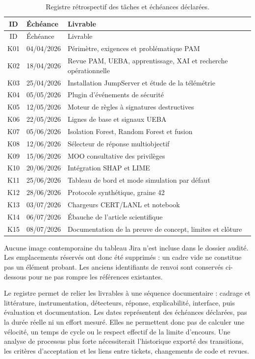 \documentclass[11pt,a4paper,oneside]{report}
\theoremstyle{definition}
\theoremstyle{plain}
\begin{document}
\begin{longtable}{@{}clp{}@{}}
\caption{Registre rétrospectif des tâches et échéances déclarées.}
\label{tab:app-jira}\\
\toprule
ID & Échéance & Livrable \\
\midrule
\endfirsthead
\toprule
ID & Échéance & Livrable \\
\midrule
\endhead
K01  & 04/04/2026 & Périmètre, exigences et problématique PAM \\
K02  & 18/04/2026 & Revue PAM, UEBA, apprentissage, XAI et recherche opérationnelle \\
K03  & 25/04/2026 & Installation JumpServer et étude de la télémétrie \\
K04  & 05/05/2026 & Plugin d'événements de sécurité \\
K05  & 12/05/2026 & Moteur de règles à signatures destructives \\
K06  & 22/05/2026 & Lignes de base et signaux UEBA \\
K07  & 05/06/2026 & Isolation Forest, Random Forest et fusion \\
K08  & 12/06/2026 & Sélecteur de réponse multiobjectif \\
K09  & 15/06/2026 & MOO consultative des privilèges \\
K10 & 20/06/2026 & Intégration SHAP et LIME \\
K11 & 25/06/2026 & Tableau de bord et mode simulation par défaut \\
K12 & 28/06/2026 & Protocole synthétique, graine 42 \\
K13 & 03/07/2026 & Chargeurs CERT/LANL et notebook \\
K14 & 06/07/2026 & Ébauche de l'article scientifique \\
K15 & 08/07/2026 & Documentation de la preuve de concept, limites et clôture \\
\bottomrule
\end{longtable}

Aucune image contemporaine du tableau Jira n'est incluse dans le dossier
audité. Les emplacements réservés ont donc été supprimés : un cadre vide ne
constitue pas un élément probant. Les anciens identifiants de renvoi sont
conservés ci-dessous pour ne pas rompre les références existantes.
\label{fig:app-kanban-mid}
\label{fig:app-kanban-final}

Le registre permet de relier les livrables à une séquence documentaire :
cadrage et littérature, instrumentation, détecteurs, réponse, explicabilité,
interface, puis évaluation et documentation. Les dates représentent des
échéances déclarées, pas la durée réelle ni un effort mesuré. Elles ne
permettent donc pas de calculer une vélocité, un temps de cycle ou le respect
effectif de la limite d'encours. Une analyse de processus plus forte
nécessiterait l'historique exporté des transitions, les critères d'acceptation
et les liens entre tickets, changements de code et revues.
\end{document}
